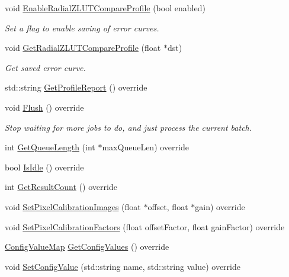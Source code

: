 \begin{DoxyCompactItemize}
void \hyperlink{class_queued_c_u_d_a_tracker_aa8b23ddd77fd1826fbcf5c2d58135f13}{Enable\+Radial\+Z\+L\+U\+T\+Compare\+Profile} (bool enabled)
\begin{DoxyCompactList}\small\item\em Set a flag to enable saving of error curves. \end{DoxyCompactList}\item 
void \hyperlink{class_queued_c_u_d_a_tracker_a1d75d74655c9da2a9cb305f95944b1e3}{Get\+Radial\+Z\+L\+U\+T\+Compare\+Profile} (float $\ast$dst)
\begin{DoxyCompactList}\small\item\em Get saved error curve. \end{DoxyCompactList}\item 
std\+::string \hyperlink{class_queued_c_u_d_a_tracker_a8969dbbc3824ca4ccb492e8eecbd6632}{Get\+Profile\+Report} () override
\item 
void \hyperlink{class_queued_c_u_d_a_tracker_a4407b12d3fc2e2969840ccc233ec96bc}{Flush} () override
\begin{DoxyCompactList}\small\item\em Stop waiting for more jobs to do, and just process the current batch. \end{DoxyCompactList}\item 
int \hyperlink{class_queued_c_u_d_a_tracker_acd209a7709c4776a585af6bd24768b13}{Get\+Queue\+Length} (int $\ast$max\+Queue\+Len) override
\item 
bool \hyperlink{class_queued_c_u_d_a_tracker_a147dbe75048a901f137e130ac61a6f7b}{Is\+Idle} () override
\item 
int \hyperlink{class_queued_c_u_d_a_tracker_aeb508df96e1cbcfaf8f0bf330e01d35c}{Get\+Result\+Count} () override
\item 
void \hyperlink{class_queued_c_u_d_a_tracker_a95264d01570acfdfd75977b06eaa0fcc}{Set\+Pixel\+Calibration\+Images} (float $\ast$offset, float $\ast$gain) override
\item 
void \hyperlink{class_queued_c_u_d_a_tracker_a59468e8c37b6bdfb2374f9db78060c0d}{Set\+Pixel\+Calibration\+Factors} (float offset\+Factor, float gain\+Factor) override
\item 
\hyperlink{class_queued_tracker_af6073682cd9e87e6f3e84f93cf9be373}{Config\+Value\+Map} \hyperlink{class_queued_c_u_d_a_tracker_a16a5fb006a594f950484df6a9d1cfd2f}{Get\+Config\+Values} () override
\item 
void \hyperlink{class_queued_c_u_d_a_tracker_abbdfa55593327bd9a26cf4ac313239ec}{Set\+Config\+Value} (std\+::string name, std\+::string value) override
\end{DoxyCompactItemize}
